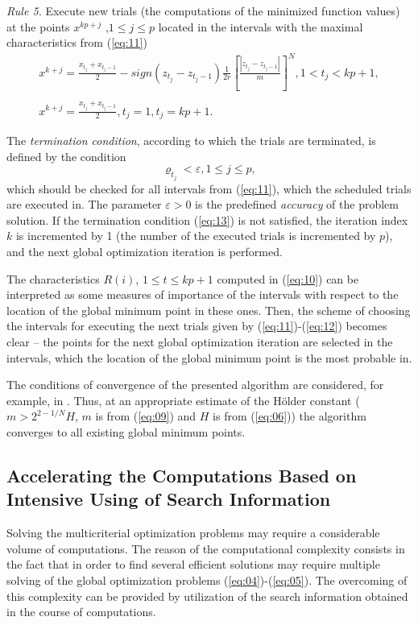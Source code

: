 \documentclass[procedia]{easychair}
\begin{document}
{\it Rule 5.} Execute new trials (the computations of the minimized function values) at the points $x^{kp+j}$ ,$1 \leq j \leq p$ located in the intervals with the maximal characteristics from (\ref{eq:11})
\begin{equation} \label{eq:12}
\begin{matrix}
x^{k+j} = \frac{x_{t_j} + x_{t_j-1}}{2} - sign(z_{t_j} - z_{t_j-1}) \frac{1}{2r} [\frac{|z_{t_j} - z_{t_j-1}|}{m}]^N, 1 < t_j < kp+1,\\
\\
x^{k+j} = \frac{x_{t_j} + x_{t_j-1}}{2}, t_j = 1 , t_j = kp + 1.
\end{matrix}
\end{equation}

The {\it termination condition}, according to which the trials are terminated, is defined by the condition 
\begin{equation} \label{eq:13}
\varrho_{t_j} < \varepsilon, 1 \leq j \leq p,
\end{equation}
which should be checked for all intervals from (\ref{eq:11}), which the scheduled trials are executed in. The parameter $\varepsilon > 0$ is the predefined {\it accuracy} of the problem solution. If the termination condition (\ref{eq:13}) is not satisfied, the iteration index $k$ is incremented by 1 (the number of the executed trials is incremented by $p$), and the next global optimization iteration is performed. \par

The characteristics $R(i)$, $1 \leq t \leq kp+1$ computed in (\ref{eq:10}) can be interpreted as some measures of importance of the intervals with respect to the location of the global minimum point in these ones. Then, the scheme of choosing the intervals for executing the next trials given by (\ref{eq:11})-(\ref{eq:12}) becomes clear -- the points for the next global optimization iteration are selected in the intervals, which the location of the global minimum point is the most probable in.\par

The conditions of convergence of the presented algorithm are considered, for example, in \cite{c35}. Thus, at an appropriate estimate of the H\"{o}lder constant ( $m > 2^{2-1/N}H$, $m$ is from (\ref{eq:09}) and $H$ is from (\ref{eq:06})) the algorithm converges to all existing global minimum points. 

\subsection{Accelerating the Computations Based on Intensive Using of Search Information}
\label{sect:4_2}
Solving the multicriterial optimization problems may require a considerable volume of computations. The reason of the computational complexity consists in the fact that in order to find several efficient solutions may require multiple solving of the global optimization problems (\ref{eq:04})-(\ref{eq:05}). The overcoming of this complexity can be provided by utilization of the search information obtained in the course of computations.\par
\end{document}
